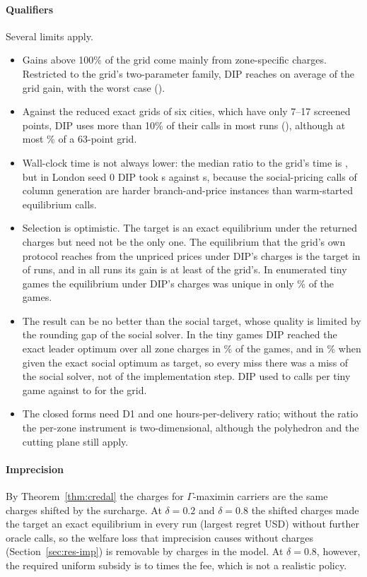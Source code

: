\documentclass[preprint,12pt]{elsarticle}
\theoremstyle{definition}
\theoremstyle{remark}
\begin{document}
\paragraph{Qualifiers} Several limits apply.
\begin{itemize}[leftmargin=*]
\item Gains above 100\% of the grid come mainly from zone-specific charges. Restricted to the grid's two-parameter family, DIP reaches on average \DipFamMean{} of the grid gain, with the worst case \DipFamMin{} (\DipFamMinCase).
\item Against the reduced exact grids of six cities, which have only 7--17 screened points, DIP uses more than 10\% of their calls in most runs (\DipRedCalls), although at most \DipCallsSixtyThreeMax\% of a 63-point grid.
\item Wall-clock time is not always lower: the median ratio to the grid's time is \DipTimeMed, but in London seed 0 DIP took \DipLondonTime{} s against \DipLondonGridTime{} s, because the social-pricing calls of column generation are harder branch-and-price instances than warm-started equilibrium calls.
\item Selection is optimistic. The target is an exact equilibrium under the returned charges but need not be the only one. The equilibrium that the grid's own protocol reaches from the unpriced prices under DIP's charges is the target in \DipSelSame{} of \DipRuns{} runs, and in all runs its gain is at least \DipSelMin{} of the grid's. In \DipTinyN{} enumerated tiny games the equilibrium under DIP's charges was unique in only \DipTinyUniquePct\% of the games.
\item The result can be no better than the social target, whose quality is limited by the rounding gap of the social solver. In the tiny games DIP reached the exact leader optimum over all zone charges in \DipTinyHitPct\% of the games, and in \DipTinyHitXPct\% when given the exact social optimum as target, so every miss there was a miss of the social solver, not of the implementation step. DIP used \DipTinyCallsMin{} to \DipTinyCallsMax{} calls per tiny game against \DipTinyGridCallsMin{} to \DipTinyGridCallsMax{} for the grid.
\item The closed forms need D1 and one hours-per-delivery ratio; without the ratio the per-zone instrument is two-dimensional, although the polyhedron and the cutting plane still apply.
\end{itemize}

\paragraph{Imprecision} By Theorem~\ref{thm:credal} the charges for $\Gamma$-maximin carriers are the same charges shifted by the surcharge. At $\delta=0.2$ and $\delta=0.8$ the shifted charges made the target an exact equilibrium in every run (largest regret \DipCredalRegret{} USD) without further oracle calls, so the welfare loss that imprecision causes without charges (Section~\ref{sec:res-imp}) is removable by charges in the model. At $\delta=0.8$, however, the required uniform subsidy is \DipCredalSubMin{} to \DipCredalSubMax{} times the fee, which is not a realistic policy.
\end{document}
